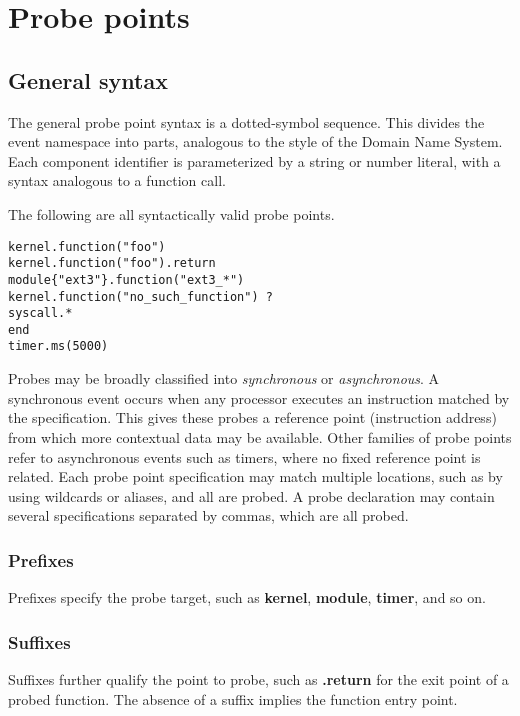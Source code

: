 \documentclass[twoside,english]{article}
\newenvironment{vindent}
{\begin{list}{}{\setlength{\listparindent}{6pt}}
\item[]}
{\end{list}}
\begin{document}
\section{Probe points\label{sec:Probe-Points}}
\subsection{General syntax}
The general probe point syntax is a dotted-symbol sequence. This divides
the event namespace into parts, analogous to the style of the Domain Name
System. Each component identifier is parameterized by a string or number
literal, with a syntax analogous to a function call.

The following are all syntactically valid probe points.

\begin{vindent}
\begin{verbatim}
kernel.function("foo")
kernel.function("foo").return
module{"ext3"}.function("ext3_*")
kernel.function("no_such_function") ?
syscall.*
end
timer.ms(5000)
\end{verbatim}
\end{vindent}
Probes may be broadly classified into \emph{synchronous}
or \emph{asynchronous}. A synchronous event occurs when
any processor executes an instruction matched by the specification. This
gives these probes a reference point (instruction address) from which more
contextual data may be available. Other families of probe points refer to
asynchronous events such as timers, where no fixed reference point is related.
Each probe point specification may match multiple locations, such as by using
wildcards or aliases, and all are probed. A probe declaration may contain
several specifications separated by commas, which are all probed.

\subsubsection{Prefixes}
Prefixes specify the probe target, such as \textbf{kernel}, \textbf{module},
\textbf{timer}, and so on.

\subsubsection{Suffixes}
Suffixes further qualify the point to probe, such as \textbf{.return} for the
exit point of a probed function. The absence of a suffix implies the function
entry point.
\end{document}
